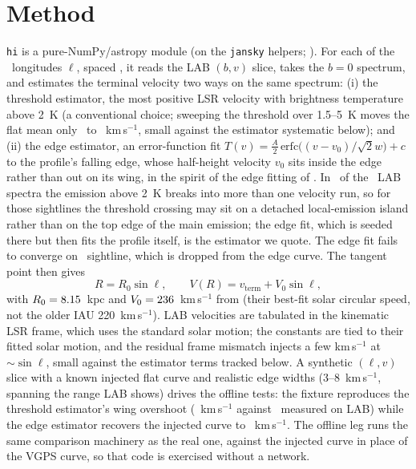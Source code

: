 \documentclass[twocolumn]{aastex631}
\newcommand{\code}[1]{\texttt{#1}}
\begin{document}
\section{Method}
\code{hi} is a pure-NumPy/astropy module (on the \code{jansky} helpers; \citealt{jansky}). For each
of the \hiNlong\ longitudes $\ell$, spaced \hiStep\arcdeg, it reads the LAB $(b,v)$ slice, takes the
$b=0$ spectrum, and estimates the terminal velocity two ways on the same spectrum: (i) the threshold estimator, the most positive LSR
velocity with brightness temperature above 2~K (a conventional choice; sweeping the threshold over
1.5--5~K moves the flat mean only \hiRealSweepLoThr\ to \hiRealSweepHiThr~km\,s$^{-1}$, small
against the estimator systematic below); and (ii) the edge estimator, an error-function fit
$T(v)=\frac{A}{2}\,\mathrm{erfc}\!\big((v-v_0)/\sqrt{2}w\big)+c$ to the profile's falling edge,
whose half-height velocity $v_0$ sits inside the edge rather than out on its wing, in the spirit of
the edge fitting of \citet{mccluregriffiths2016}. In \hiRealNNoncontig\ of the \hiNlong\ LAB spectra the
emission above 2~K breaks into more than one velocity run, so for those sightlines the threshold
crossing may sit on a detached local-emission island rather than on the top edge of the main
emission; the edge fit, which is seeded there but then fits the profile itself, is the estimator we
quote. The edge fit fails to converge on \hiRealNEdgeFail\ sightline, which is dropped from the edge
curve. The tangent point then gives
\begin{equation}
R = R_0\sin\ell, \qquad V(R) = v_\mathrm{term} + V_0\sin\ell,
\end{equation}
with $R_0=8.15$~kpc and $V_0=236$~km\,s$^{-1}$ from \citet{reid2019} (their best-fit solar
circular speed, not the older IAU 220~km\,s$^{-1}$). LAB velocities are tabulated in the kinematic
LSR frame, which uses the standard solar motion; the \citet{reid2019} constants are tied to their
fitted solar motion, and the residual frame mismatch injects a few km\,s$^{-1}$ at $\sim\sin\ell$,
small against the estimator terms tracked below. A synthetic $(\ell,v)$ slice with a known injected
flat curve and realistic edge widths (3--8~km\,s$^{-1}$, spanning the range LAB shows) drives the
offline tests: the fixture reproduces the threshold estimator's wing overshoot
(\hiSynThrMinusEdge~km\,s$^{-1}$ against \hiRealThrMinusEdge\ measured on LAB) while the edge
estimator recovers the injected curve to \hiSynRefEdgeOffset~km\,s$^{-1}$. The offline leg runs the
same comparison machinery as the real one, against the injected curve in place of the VGPS curve, so
that code is exercised without a network.
\end{document}
